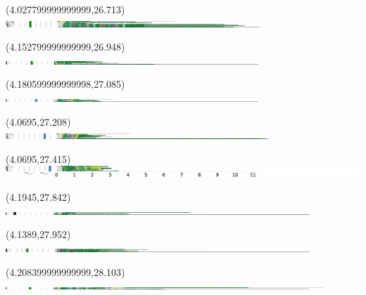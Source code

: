 \documentclass{article}
\begin{document}
\begin{textblock}{13}(4.027799999999999,26.713)\includegraphics{latex/figures/haplotypes-constrained/18qtel_1-500K_1_12_12_rc-HG003.pdf}\end{textblock}
\begin{textblock}{13}(4.152799999999999,26.948)\includegraphics{latex/figures/haplotypes-constrained/18qtel_1-500K_1_12_12_rc-HG004.pdf}\end{textblock}
\begin{textblock}{13}(4.180599999999998,27.085)\includegraphics{latex/figures/haplotypes-constrained/18qtel_1-500K_1_12_12_rc-HG005.pdf}\end{textblock}
\begin{textblock}{13}(4.0695,27.208)\includegraphics{latex/figures/haplotypes-constrained/18qtel_1-500K_1_12_12_rc-HG006.pdf}\end{textblock}
\begin{textblock}{13}(4.0695,27.415)\includegraphics{latex/figures/haplotypes-constrained/18qtel_1-500K_1_12_12_rc-HG007.pdf}\end{textblock}
\begin{textblock}{13}(4.1945,27.842)\includegraphics{latex/figures/haplotypes-constrained/chr19-HG001.pdf}\end{textblock}
\begin{textblock}{13}(4.1389,27.952)\includegraphics{latex/figures/haplotypes-constrained/chr19-HG003.pdf}\end{textblock}
\begin{textblock}{13}(4.208399999999999,28.103)\includegraphics{latex/figures/haplotypes-constrained/chr19-HG004.pdf}\end{textblock}
\end{document}

